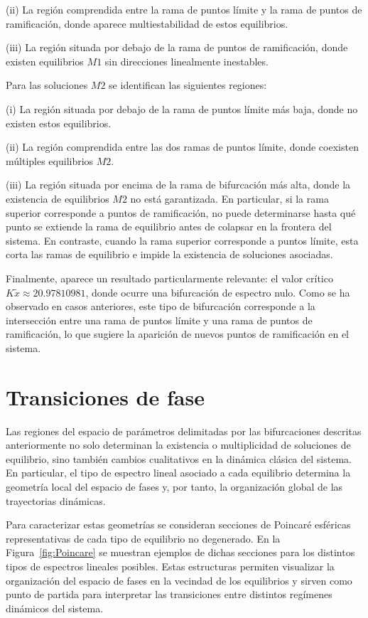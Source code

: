 (ii) La región comprendida entre la rama de puntos límite y la rama de puntos de ramificación, donde aparece multiestabilidad de estos equilibrios.

(iii) La región situada por debajo de la rama de puntos de ramificación, donde existen equilibrios $M1$ sin direcciones linealmente inestables.

Para las soluciones $M2$ se identifican las siguientes regiones:

(i) La región situada por debajo de la rama de puntos límite más baja, donde no existen estos equilibrios.

(ii) La región comprendida entre las dos ramas de puntos límite, donde coexisten múltiples equilibrios $M2$.

(iii) La región situada por encima de la rama de bifurcación más alta, donde la existencia de equilibrios $M2$ no está garantizada. En particular, si la rama superior corresponde a puntos de ramificación, no puede determinarse hasta qué punto se extiende la rama de equilibrio antes de colapsar en la frontera del sistema. En contraste, cuando la rama superior corresponde a puntos límite, esta corta las ramas de equilibrio e impide la existencia de soluciones asociadas.

Finalmente, aparece un resultado particularmente relevante: el valor crítico $K\tilde{x} \approx 20.97810981$, donde ocurre una bifurcación de espectro nulo. Como se ha observado en casos anteriores, este tipo de bifurcación corresponde a la intersección entre una rama de puntos límite y una rama de puntos de ramificación, lo que sugiere la aparición de nuevos puntos de ramificación en el sistema.

\section{Transiciones de fase}

Las regiones del espacio de parámetros delimitadas por las bifurcaciones descritas anteriormente no solo determinan la existencia o multiplicidad de soluciones de equilibrio, sino también cambios cualitativos en la dinámica clásica del sistema. En particular, el tipo de espectro lineal asociado a cada equilibrio determina la geometría local del espacio de fases y, por tanto, la organización global de las trayectorias dinámicas.

Para caracterizar estas geometrías se consideran secciones de Poincaré esféricas representativas de cada tipo de equilibrio no degenerado. En la Figura~\ref{fig:Poincare} se muestran ejemplos de dichas secciones para los distintos tipos de espectros lineales posibles. Estas estructuras permiten visualizar la organización del espacio de fases en la vecindad de los equilibrios y sirven como punto de partida para interpretar las transiciones entre distintos regímenes dinámicos del sistema.

